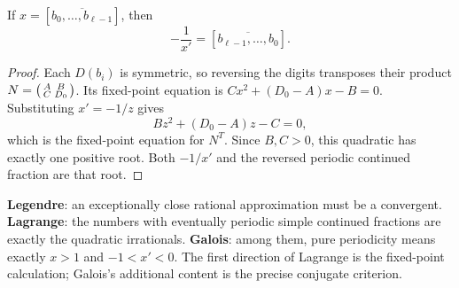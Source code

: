 \begin{corollary}
\label{cor:period-reversal}
If $x=[\overline{b_0,\ldots,b_{\ell-1}}]$, then
\[
 -\frac1{x'}=[\overline{b_{\ell-1},\ldots,b_0}].
\]
\end{corollary}
\begin{proof}
Each $D(b_i)$ is symmetric, so reversing the digits transposes their
product $N=\begin{psmallmatrix}A&B\\C&D_0\end{psmallmatrix}$.
Its fixed-point equation is $Cx^2+(D_0-A)x-B=0$. Substituting
$x'=-1/z$ gives
\[
 Bz^2+(D_0-A)z-C=0,
\]
which is the fixed-point equation for $N^T$. Since $B,C>0$, this
quadratic has exactly one positive root. Both $-1/x'$ and the
reversed periodic continued fraction are that root.
\end{proof}

\begin{checkpoint}[title={Three names, three different conclusions}]
\textbf{Legendre}: an exceptionally close rational approximation must
be a convergent.
\quad\textbf{Lagrange}: the numbers with eventually periodic simple
continued fractions are exactly the quadratic irrationals.
\quad\textbf{Galois}: among them, pure periodicity means exactly
$x>1$ and $-1<x'<0$.
The first direction of Lagrange is the fixed-point calculation;
Galois's additional content is the precise conjugate criterion.
\end{checkpoint}
